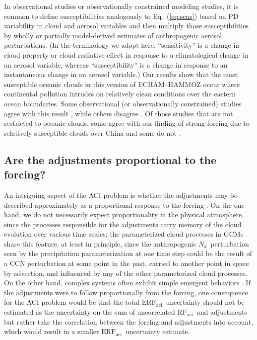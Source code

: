 \documentclass[acp, manuscript]{copernicus}\usepackage[]{graphicx}\usepackage[]{color}
\newcommand\nd{\ensuremath{N_d}}
\newcommand\cdnc{\nd}
\newcommand\erfaci{\ensuremath{\text{ERF}_\text{aci}}}
\newcommand\rfaci{\ensuremath{\text{RF}_\text{aci}}}
\begin{document}
In observational studies or observationally constrained modeling studies, it is
common to define susceptibilities analogously to Eq.~(\ref{eq:sens}) based on PD
variability in cloud and aerosol variables and then multiply those
susceptibilities by wholly or partially \citep{Bellouin2013,Kinne2019}
model-derived estimates of anthropogenic aerosol perturbations.  (In the
terminology we adopt here, ``sensitivity'' is a change in cloud property or
cloud radiative effect in response to a climatological change in an aerosol
variable, whereas ``susceptibility'' is a change in response to an instantaneous
change in an aerosol variable.)  Our results show that the most susceptible
oceanic clouds in this version of ECHAM--HAMMOZ occur where continental
pollution intrudes on relatively clean conditions over the eastern ocean
boundaries.  Some observational (or observationally constrained) studies agree
with this result \citep{Quaas2008,Alterskjaer2012,Engstrom2015,Gryspeerdt2016,
  Andersen2017, Christensen2017,McCoy2017}, while others disagree
\citep{Lebsock2008,Chen2014, Gryspeerdt2017}.  Of those studies that are not
restricted to oceanic clouds, some agree with our finding of strong forcing due
to relatively susceptible clouds over China \citep{Gryspeerdt2017,McCoy2017} and
some do not \citep{Quaas2008, Alterskjaer2012, Gryspeerdt2016}.

\subsection{Are the adjustments proportional to the forcing?}
\label{sec:proportion}

An intriguing aspect of the ACI problem is whether the adjustments may be
described approximately as a proportional response to the forcing
\citep{Gryspeerdt2019a}.  On the one hand, we do not necessarily expect
proportionality in the physical atmosphere, since the processes responsible for
the adjustments carry memory of the cloud evolution over various time scales;
the parameterized cloud processes in GCMs share this feature, at least in
principle, since the anthropogenic \cdnc\ perturbation seen by the precipitation
parameterization at one time step could be the result of a CCN perturbation at
some point in the past, carried to another point in space by advection, and
influenced by any of the other parameterized cloud processes.  On the other
hand, complex systems often exhibit simple emergent behaviors
\citep[e.g.,][and references therein]{Muelmenstaedt2018}.  If the adjustments
were to follow proportionally from the forcing, one consequence for the ACI
problem would be that the total \erfaci\ uncertainty should not be estimated as
the uncertainty on the sum of uncorrelated \rfaci\ and adjustments but rather
take the correlation between the forcing and adjustments into account, which
would result in a smaller \erfaci\ uncertainty estimate.  
\end{document}
